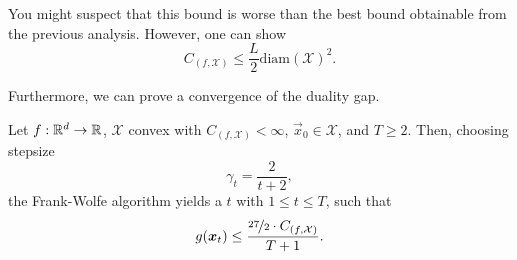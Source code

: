 You might suspect that this bound is worse than the best bound obtainable from the previous
analysis. However, one can show \[
    C_{(f, \mathcal{X})} \leq \frac{L}{2} \mathrm{diam}(\mathcal{X})^2.
\]

Furthermore, we can prove a convergence of the duality gap.

\begin{theorem}
    Let $f: \R^d \to \R$, $\mathcal{X}$ convex with $C_{(f, \mathcal{X})} < \infty$, $\vec{x}_0
        \in \mathcal{X}$, and $T \geq 2$. Then, choosing stepsize \[
        \gamma_t = \frac{2}{t+2},
    \]
    the Frank-Wolfe algorithm yields a $t$ with $1 \leq t \leq T$, such that \[
        g(\vec{x}_t) \leq \frac{\nicefrac{27}{2} \cdot C_{(f, \mathcal{X})}}{T+1}.
    \]

\end{theorem}

